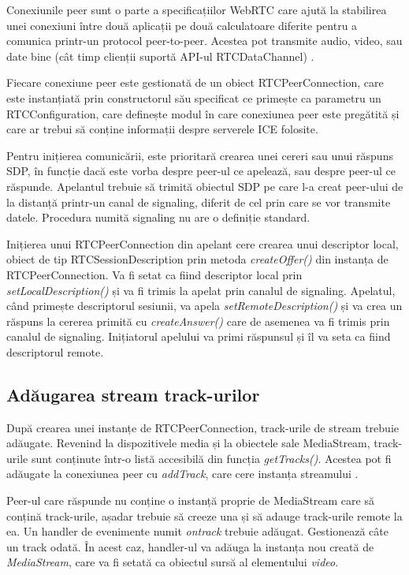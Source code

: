 \indent \par Conexiunile peer sunt o parte a specificațiilor WebRTC care ajută la stabilirea unei conexiuni între două aplicații pe două calculatoare diferite pentru a comunica printr-un protocol peer-to-peer. Acestea pot transmite audio, video, sau date bine (cât timp clienții suportă API-ul RTCDataChannel) \cite{WebPeer2014}.
\indent \par Fiecare conexiune peer este gestionată de un obiect RTCPeerConnection, care este instanțiată prin constructorul său specificat ce primește ca parametru un RTCConfiguration, care definește modul în care conexiunea peer este pregătită și care ar trebui să conține informații despre serverele ICE folosite.
\indent \par Pentru inițierea comunicării, este prioritară crearea unei cereri sau unui răspuns SDP, în funcție dacă este vorba despre peer-ul ce apelează, sau despre peer-ul ce răspunde. Apelantul trebuie să trimită obiectul SDP pe care l-a creat peer-ului de la distanță printr-un canal de signaling, diferit de cel prin care se vor transmite datele. Procedura numită signaling nu are o definiție standard.
\indent \par Inițierea unui RTCPeerConnection din apelant cere crearea unui descriptor local, obiect de tip RTCSessionDescription prin metoda \textit{createOffer()} din instanța de RTCPeerConnection. Va fi setat ca fiind descriptor local prin \textit{setLocalDescription()} și va fi trimis la apelat prin canalul de signaling. Apelatul, când primește descriptorul sesiunii, va apela \textit{setRemoteDescription()} și va crea un răspuns la cererea primită cu \textit{createAnswer()} care de asemenea va fi trimis prin canalul de signaling. Inițiatorul apelului va primi răspunsul și îl va seta ca fiind descriptorul remote.

\subsection{Adăugarea stream track-urilor}
\label{sec:ch3sec4subsec3}

\indent \par După crearea unei instanțe de RTCPeerConnection, track-urile de stream trebuie adăugate. Revenind la dispozitivele media și la obiectele sale MediaStream, track-urile sunt conținute într-o listă accesibilă din funcția \textit{getTracks()}. Acestea pot fi adăugate la conexiunea peer cu \textit{addTrack}, care cere instanța streamului \cite{WebStream2014}.
\indent \par Peer-ul care răspunde nu conține o instanță proprie de MediaStream care să conțină track-urile, așadar trebuie să creeze una și să adauge track-urile remote la ea. Un handler de evenimente numit \textit{ontrack} trebuie adăugat. Gestionează câte un track odată. În acest caz, handler-ul va adăuga la instanța nou creată de \textit{MediaStream}, care va fi setată ca obiectul sursă al elementului \textit{video}.

